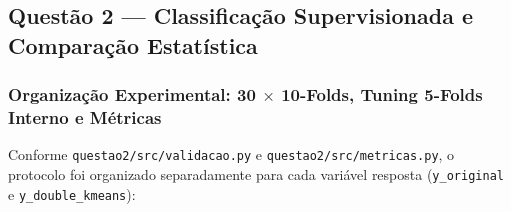 \documentclass[a4paper,11pt]{article}
\begin{document}
\subsection{Questão 2 --- Classificação Supervisionada e Comparação Estatística}\label{sec:2-3-questao-2-classificacao-supervisionada-e-comparacao-estatistica}


\subsubsection{\texorpdfstring{Organização Experimental: 30 $\times$ 10-Folds, Tuning 5-Folds Interno e Métricas}{Organização Experimental: 30 x 10-Folds, Tuning 5-Folds Interno e Métricas}}\label{sec:2-3-1-organizacao-experimental-30-10-folds-tuning-5-folds-interno-e-metricas}


Conforme \texttt{questao2/\allowbreak src/\allowbreak validacao.py} e \texttt{questao2/\allowbreak src/\allowbreak metricas.py}, o protocolo foi organizado separadamente para cada variável resposta (\texttt{y\_\allowbreak original} e \texttt{y\_\allowbreak double\_\allowbreak kmeans}):
\end{document}
